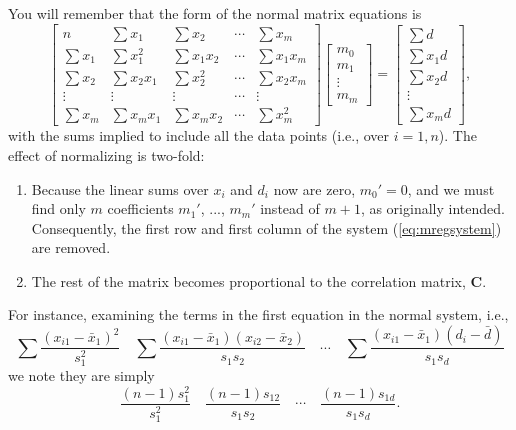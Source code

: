 You will remember that the form of the  normal matrix equations is
\begin{equation}
\left [ \begin{array}{ccccc}
n &  \sum x_1 &  \sum x_2 & \cdots &  \sum x_m \\[5pt]
 \sum x_1 &  \sum x^2_1 & \sum x_1 x_2 & \cdots &  \sum x_1 x_m \\[5pt]
 \sum x_2 &  \sum x_2 x_1 & \sum x^2_2 & \cdots &  \sum x_2 x_m \\[5pt]
\vdots & \vdots & \vdots & \cdots & \vdots \\[5pt]
 \sum x_m &  \sum x_m x_1  & \sum x_m x_2 & \cdots &  \sum x^2_m 
\end{array} \right ] 
\left [ \begin{array}{c}
m_0\\ m_1\\ \vdots \\ m_m \end{array} \right ]  = 
\left [
\begin{array}{c}
 \sum d \\[5pt]  \sum x_1 d \\[5pt]  \sum x_2 d \\[5pt] \vdots \\[5pt] \sum x_m d
\end{array} \right ] ,
\label{eq:mregsystem}
\end{equation}
with the sums implied to include all the data points (i.e., over $i = 1,n$).
The effect of normalizing is two-fold:
\begin{enumerate}
\item	Because the linear sums over $x_i$ and $d_i$ now are zero, $m_0' = 0$, and we must find only $m$ coefficients $m_1'$, ..., $m_m'$ instead of $m + 1$, as originally 
intended.  Consequently, the first row and first column of the system (\ref{eq:mregsystem}) are removed.
\item	The rest of the matrix becomes proportional to the correlation matrix, $\mathbf{C}$.
\end{enumerate}
For instance, examining the terms in the first equation in the normal system, i.e.,
\begin{equation}
\sum \frac{(x_{i1} - \bar{x}_1) ^2}{s^2_1} \quad \sum \frac{(x_{i1} - \bar{x}_1) (x_{i2} - \bar{x}_2)}{s_1s_2} \quad \cdots \quad \sum 
\frac{(x_{i1} - \bar{x}_1)(d_i - \bar{d})}{s_1s_d}
\end{equation}	 
we note they are simply
\begin{equation}
\frac{(n-1)s^2_1}{s^2_1}  \quad \frac{(n-1)s_{12}}{s_1 s_2} \quad \cdots \quad \frac{(n-1)s_{1d}}{s_1 s_d}.
\end{equation}	 
